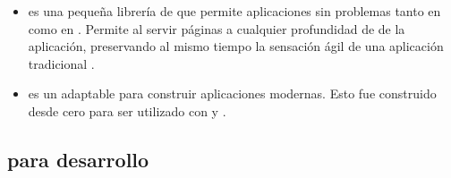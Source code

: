\begin{itemize}
		\item
			\textbf{\rendrNAME} es una pequeña librería de \airbnbNAME \cite{online_technology_airbnb_officialsite} que permite \runCPT aplicaciones \backbonejsNAME sin problemas tanto en \clientSideAS como en \serverSideAS. Permite al \webserverINT servir páginas \htmlNAME \fullyFormedCPT a cualquier profundidad de \linkINT de la aplicación, preservando al mismo tiempo la sensación ágil de una aplicación \mvcAS \clientSideAS \backbonejsNAME tradicional \cite{online_technology_isomorphic_javascript_frameworks}.
		\item
			\textbf{\flatironNAME} es un \frameworkPC adaptable para construir aplicaciones \webINT modernas. Esto fue construido desde cero para ser utilizado con \javaScriptNAME y \nodejsNAME \cite{online_technology_flatiron_officialsite}.

	\end{itemize}

	

\subsection{\toolsCPT para desarrollo}


